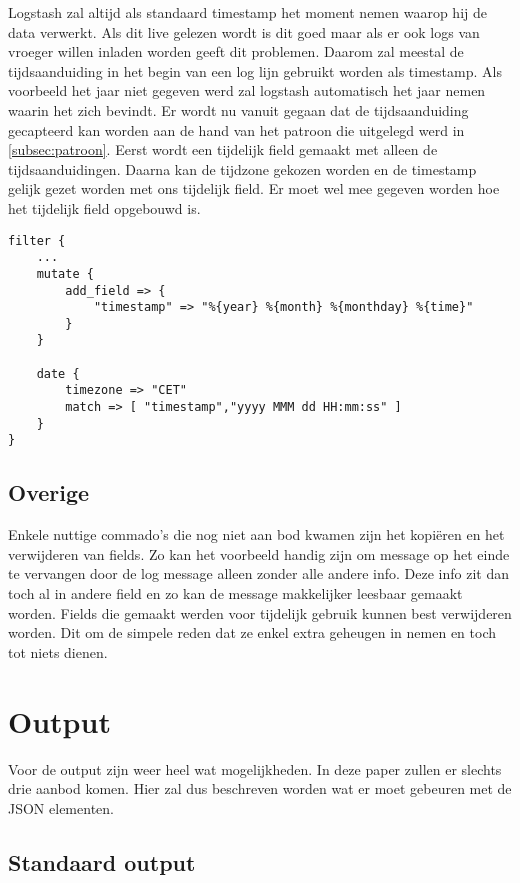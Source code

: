 Logstash zal altijd als standaard timestamp het moment nemen waarop hij de data verwerkt. Als dit live gelezen wordt is dit goed maar als er ook logs van vroeger willen inladen worden geeft dit problemen.  Daarom zal meestal de tijdsaanduiding in het begin van een log lijn gebruikt worden als timestamp. Als voorbeeld het jaar niet gegeven werd zal logstash automatisch het jaar nemen waarin het zich bevindt. Er wordt nu vanuit gegaan dat de tijdsaanduiding gecapteerd kan worden aan de hand van het patroon die uitgelegd werd in \ref{subsec:patroon}. Eerst wordt een tijdelijk field gemaakt met alleen de tijdsaanduidingen. Daarna kan de tijdzone gekozen worden en de timestamp gelijk gezet worden met ons tijdelijk field. Er moet wel mee gegeven worden hoe het tijdelijk field opgebouwd is. 

\lstset{escapechar=@,style=customc}  
\begin{lstlisting}[frame=single]  
filter {
	...
	mutate {
		add_field => {
			"timestamp" => "%{year} %{month} %{monthday} %{time}"
		}
	}

	date {
		timezone => "CET"
		match => [ "timestamp","yyyy MMM dd HH:mm:ss" ]  
	}
}
\end{lstlisting}

\subsection{Overige}
\label{subsec:overige}

Enkele nuttige commado’s die nog niet aan bod kwamen zijn het kopiëren en het verwijderen van fields. Zo kan het voorbeeld handig zijn om message op het einde te vervangen door de log message alleen zonder alle andere info. Deze info zit dan toch al in andere field en zo kan de message makkelijker leesbaar gemaakt worden. Fields die gemaakt werden voor tijdelijk gebruik kunnen best verwijderen worden. Dit om de simpele reden dat ze enkel extra geheugen in nemen en toch tot niets dienen.

\section{Output}
Voor de output zijn weer heel wat mogelijkheden. In deze paper zullen er slechts drie aanbod komen. Hier zal dus beschreven worden wat er moet gebeuren met de JSON elementen.

\subsection{Standaard output}
\label{subsec:standaardoutput}

